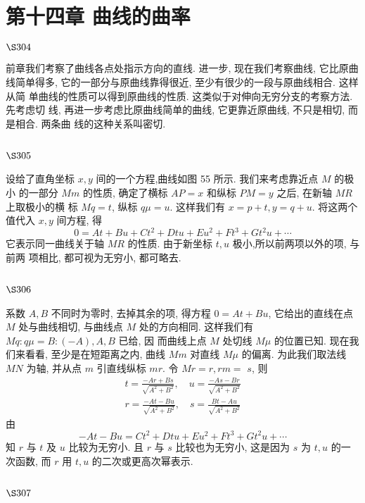\chapter{第十四章 曲线的曲率}

$\S 304$

前章我们考察了曲线各点处指示方向的直线. 进一步, 现在我们考察曲线, 它比原曲 线简单得多, 它的一部分与原曲线靠得很近, 至少有很少的一段与原曲线相合. 这样从简 单曲线的性质可以得到原曲线的性质. 这类似于对伸向无穷分支的考察方法. 先考虑切 线, 再进一步考虑比原曲线简单的曲线, 它更靠近原曲线, 不只是相切, 而是相合. 两条曲 线的这种关系叫密切.

\section{$\S 305$}

设给了直角坐标 $x, y$ 间的一个方程,曲线如图 55 所示. 我们来考虑靠近点 $M$ 的极小 的一部分 $M m$ 的性质, 确定了横标 $A P=x$ 和纵标 $P M=y$ 之后, 在新轴 $M R$ 上取极小的横 标 $M q=t$, 纵标 $q \mu=u$. 这样我们有 $x=p+t, y=q+u$. 将这两个值代入 $x, y$ 间方程, 得
\[
0=A t+B u+C t^{2}+D t u+E u^{2}+F t^{3}+G t^{2} u+\cdots
\]
它表示同一曲线关于轴 $M R$ 的性质. 由于新坐标 $t, u$ 极小,所以前两项以外的项, 与前两 项相比, 都可视为无穷小, 都可略去.

\section{$\S 306$}

系数 $A, B$ 不同时为零时, 去掉其余的项, 得方程 $0=A t+B u$, 它给出的直线在点 $M$ 处与曲线相切, 与曲线点 $M$ 处的方向相同. 这样我们有 $M q: q \mu=B:(-A), A, B$ 已给, 因 而曲线上点 $M$ 处切线 $M \mu$ 的位置已知. 现在我们来看看, 至少是在短距离之内, 曲线 $M m$ 对直线 $M \mu$ 的偏离. 为此我们取法线 $M N$ 为轴, 并从点 $m$ 引直线纵标 $m r$. 令 $M r=r, r m=$ $s$, 则
\[
\begin{array}{lr}
t=\frac{-A r+B s}{\sqrt{A^{2}+B^{2}}}, \quad u=\frac{-A s-B r}{\sqrt{A^{2}+B^{2}}} \\
r=\frac{-A t-B u}{\sqrt{A^{2}+B^{2}}}, \quad s=\frac{B t-A u}{\sqrt{A^{2}+B^{2}}}
\end{array}
\]
由
\[
-A t-B u=C t^{2}+D t u+E u^{2}+F t^{3}+G t^{2} u+\cdots
\]
知 $r$ 与 $t$ 及 $u$ 比较为无穷小. 且 $r$ 与 $s$ 比较也为无穷小, 这是因为 $s$ 为 $t, u$ 的一次函数, 而 $r$ 用 $t, u$ 的二次或更高次幂表示.

\section{$\S 307$}

